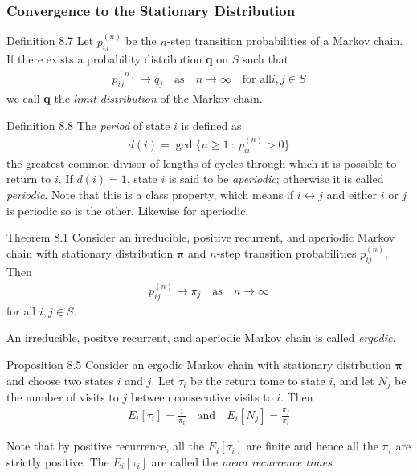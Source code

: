 \subsubsection{Convergence to the Stationary Distribution}
\begin{boks}{Definition 8.7}
  Let $p_{ij}^{(n)}$ be the $n$-step transition probabilities of a Markov chain.
  If there exists a probability distribution \textbf{q} on $S$ such that
  \begin{align*}
    p_{ij}^{(n)} \rightarrow q_j \quad \text{as} \quad n \rightarrow \infty \quad \text{for all} i,j \in S
  \end{align*}
  we call \textbf{q} the \textit{limit distribution} of the Markov chain.
\end{boks}
\begin{boks}{Definition 8.8}
  The \textit{period} of state $i$ is defined as
  \begin{align*}
    d(i) = \gcd \{ n \geq 1 \ : \ p_{ii}^{(n)} > 0 \}
  \end{align*}
  the greatest common divisor of lengths of cycles through which it is possible to return to $i$. If $d(i) = 1$, state $i$ is said to be \textit{aperiodic}; otherwise it is called \textit{periodic}. Note that this is a class property, which means if $i \leftrightarrow j$ and either $i$ or $j$ is periodic so is the other. Likewise for aperiodic.
\end{boks}
\begin{boks}{Theorem 8.1}
  Consider an irreducible, positive recurrent, and aperiodic Markov chain with stationary distribution $\boldsymbol{\pi}$ and $n$-step transition probabilities $p_{ij}^{(n)}$. Then
  \begin{align*}
    p_{ij}^{(n)} \rightarrow \pi_j \quad \text{as} \quad n \rightarrow \infty
  \end{align*}
  for all $i,j \in S$.
\end{boks}
An irreducible, positve recurrent, and aperiodic Markov chain is called \textit{ergodic}.
\begin{boks}{Proposition 8.5}
  Consider an ergodic Markov chain with stationary distrbution $\boldsymbol{\pi}$ and choose two states $i$ and $j$. Let $\tau_i$ be the return tome to state $i$, and let $N_j$ be the number of visits to $j$ between consecutive visits to $i$. Then
  \begin{align*}
    E_i[\tau_i] = \frac{1}{\pi_i} \quad \text{and} \quad
    E_i[N_j] = \frac{\pi_j}{\pi_i}
  \end{align*}
\end{boks}
Note that by positive recurrence, all the $E_i[\tau_i]$ are finite and hence all the $\pi_i$ are strictly positive. The $E_i[\tau_i]$ are called the \textit{mean recurrence times}. 
